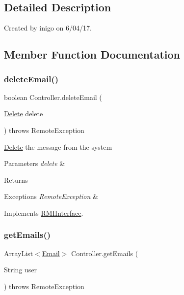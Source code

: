 \subsection{Detailed Description}
Created by inigo on 6/04/17. 

\subsection{Member Function Documentation}
\mbox{\label{class_controller_ab681529b51d028c04978b1856f481809}} 
\subsubsection{\texorpdfstring{delete\+Email()}{deleteEmail()}}
{\footnotesize\ttfamily boolean Controller.\+delete\+Email (\begin{DoxyParamCaption}\item[{\hyperlink{class_delete}{Delete}}]{delete }\end{DoxyParamCaption}) throws Remote\+Exception}

\hyperlink{class_delete}{Delete} the message from the system 
\begin{DoxyParams}{Parameters}
{\em delete} & \\
\hline
\end{DoxyParams}
\begin{DoxyReturn}{Returns}

\end{DoxyReturn}

\begin{DoxyExceptions}{Exceptions}
{\em Remote\+Exception} & \\
\hline
\end{DoxyExceptions}


Implements \hyperlink{interface_r_m_i_interface_a86bc2a5cb0bdb04a1aeb9b36e373cd5e}{R\+M\+I\+Interface}.

\mbox{\label{class_controller_ab019b3e68c16d6be3c3e9a33ca11ba8f}} 
\subsubsection{\texorpdfstring{get\+Emails()}{getEmails()}}
{\footnotesize\ttfamily Array\+List$<$\hyperlink{class_email}{Email}$>$ Controller.\+get\+Emails (\begin{DoxyParamCaption}\item[{String}]{user }\end{DoxyParamCaption}) throws Remote\+Exception}

